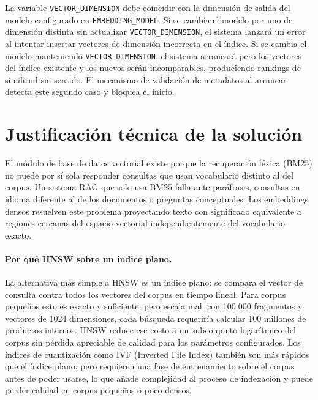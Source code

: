 \documentclass[11pt]{article}
\begin{document}
La variable \texttt{VECTOR\_DIMENSION} debe coincidir con la dimensión de salida del modelo
configurado en \texttt{EMBEDDING\_MODEL}. Si se cambia el modelo por uno de dimensión
distinta sin actualizar \texttt{VECTOR\_DIMENSION}, el sistema lanzará un error al intentar
insertar vectores de dimensión incorrecta en el índice. Si se cambia el modelo manteniendo
\texttt{VECTOR\_DIMENSION}, el sistema arrancará pero los vectores del índice existente y
los nuevos serán incomparables, produciendo rankings de similitud sin sentido. El mecanismo
de validación de metadatos al arrancar detecta este segundo caso y bloquea el inicio.

\section{Justificación técnica de la solución}

El módulo de base de datos vectorial existe porque la recuperación léxica (BM25) no puede
por sí sola responder consultas que usan vocabulario distinto al del corpus. Un sistema RAG
que solo usa BM25 falla ante paráfrasis, consultas en idioma diferente al de los documentos
o preguntas conceptuales. Los embeddings densos resuelven este problema proyectando texto
con significado equivalente a regiones cercanas del espacio vectorial independientemente del
vocabulario exacto.

\paragraph{Por qué HNSW sobre un índice plano.}
La alternativa más simple a HNSW es un índice plano: se compara el vector de consulta contra
todos los vectores del corpus en tiempo lineal. Para corpus pequeños esto es exacto y
suficiente, pero escala mal: con 100.000 fragmentos y vectores de 1024 dimensiones, cada
búsqueda requeriría calcular 100 millones de productos internos. HNSW reduce ese costo a un
subconjunto logarítmico del corpus sin pérdida apreciable de calidad para los parámetros
configurados. Los índices de cuantización como IVF (Inverted File Index) también son más
rápidos que el índice plano, pero requieren una fase de entrenamiento sobre el corpus antes
de poder usarse, lo que añade complejidad al proceso de indexación y puede perder calidad en
corpus pequeños o poco densos.
\end{document}

